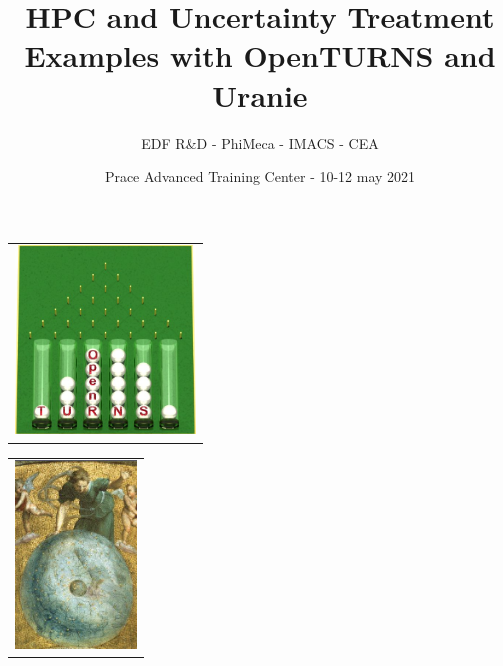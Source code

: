 \documentclass[11pt, french, A4wide]{article}
\title{HPC and Uncertainty Treatment \\
 Examples with OpenTURNS and Uranie}
\author{EDF R\&D - PhiMeca - IMACS - CEA}
\date{Prace Advanced Training Center - 10-12 may 2021}
\theoremstyle{remark}
\theoremstyle{definition}
\begin{document}
  \maketitle


\vspace*{2cm}


\begin{minipage}{8cm}
  \begin{center}
    \begin{tabular}{c}
\includegraphics[height=5cm]{logoOpenTURNS.jpg}
    \end{tabular}
  \end{center}
\end{minipage}
\hfill
\begin{minipage}{8cm}
  \begin{center}
    \begin{tabular}{c}
\includegraphics[height=5cm]{uranie_splash.png}
    \end{tabular}
  \end{center}
\end{minipage}

\vspace*{2cm}
\end{document}
